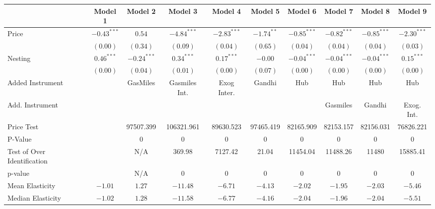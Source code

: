 
\begin{tabular}{l c c c c c c c c c}
\toprule
 & Model 1 & Model 2 & Model 3 & Model 4 & Model 5 & Model 6 & Model 7 & Model 8 & Model 9 \\
\midrule
Price                       & $-0.43^{***}$ & $0.54$        & $-4.84^{***}$ & $-2.83^{***}$ & $-1.74^{**}$ & $-0.85^{***}$ & $-0.82^{***}$ & $-0.85^{***}$ & $-2.30^{***}$ \\
                            & $(0.00)$      & $(0.34)$      & $(0.09)$      & $(0.04)$      & $(0.65)$     & $(0.04)$      & $(0.04)$      & $(0.04)$      & $(0.03)$      \\
Nesting                     & $0.46^{***}$  & $-0.24^{***}$ & $0.34^{***}$  & $0.17^{***}$  & $-0.00$      & $-0.04^{***}$ & $-0.04^{***}$ & $-0.04^{***}$ & $0.15^{***}$  \\
                            & $(0.00)$      & $(0.04)$      & $(0.01)$      & $(0.00)$      & $(0.07)$     & $(0.00)$      & $(0.00)$      & $(0.00)$      & $(0.00)$      \\
\midrule
Added Instrument            &               & GasMiles      & Gasmiles Int. & Exog Inter.   & Gandhi       & Hub           & Hub           & Hub           & Hub           \\
Add. Instrument             &               &               &               &               &              &               & Gasmiles      & Gandhi        & Exog. Int.    \\
Price Test                  &               & 97507.399     & 106321.961    & 89630.523     & 97465.419    & 82165.909     & 82153.157     & 82156.031     & 76826.221     \\
P-Value                     &               & 0             & 0             & 0             & 0            & 0             & 0             & 0             & 0             \\
Test of Over Identification &               & N/A           & 369.98        & 7127.42       & 21.04        & 11454.04      & 11488.26      & 11480         & 15885.41      \\
p-value                     &               & N/A           & 0             & 0             & 0            & 0             & 0             & 0             & 0             \\
Mean Elasticity             & $-1.01$       & $1.27$        & $-11.48$      & $-6.71$       & $-4.13$      & $-2.02$       & $-1.95$       & $-2.03$       & $-5.46$       \\
Median Elasticity           & $-1.02$       & $1.28$        & $-11.58$      & $-6.77$       & $-4.16$      & $-2.04$       & $-1.96$       & $-2.04$       & $-5.51$       \\

\end{tabular}

